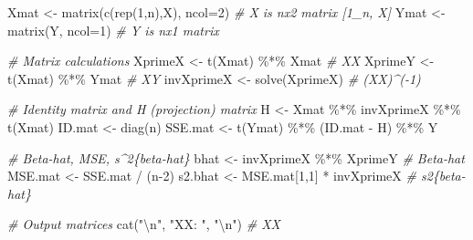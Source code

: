 \documentclass[
]{article}
\newenvironment{Shaded}{\begin{snugshade}}{\end{snugshade}}
\newcommand{\AttributeTok}[1]{\textcolor[rgb]{0.77,0.63,0.00}{#1}}
\newcommand{\CommentTok}[1]{\textcolor[rgb]{0.56,0.35,0.01}{\textit{#1}}}
\newcommand{\DecValTok}[1]{\textcolor[rgb]{0.00,0.00,0.81}{#1}}
\newcommand{\FunctionTok}[1]{\textcolor[rgb]{0.00,0.00,0.00}{#1}}
\newcommand{\NormalTok}[1]{#1}
\newcommand{\OtherTok}[1]{\textcolor[rgb]{0.56,0.35,0.01}{#1}}
\newcommand{\SpecialCharTok}[1]{\textcolor[rgb]{0.00,0.00,0.00}{#1}}
\newcommand{\StringTok}[1]{\textcolor[rgb]{0.31,0.60,0.02}{#1}}
\begin{document}
\begin{Shaded}
\begin{Highlighting}[]
\NormalTok{Xmat }\OtherTok{\textless{}{-}} \FunctionTok{matrix}\NormalTok{(}\FunctionTok{c}\NormalTok{(}\FunctionTok{rep}\NormalTok{(}\DecValTok{1}\NormalTok{,n),X), }\AttributeTok{ncol=}\DecValTok{2}\NormalTok{) }\CommentTok{\# X is nx2 matrix [1\_n, X]}
\NormalTok{Ymat }\OtherTok{\textless{}{-}} \FunctionTok{matrix}\NormalTok{(Y, }\AttributeTok{ncol=}\DecValTok{1}\NormalTok{) }\CommentTok{\# Y is nx1 matrix}

\CommentTok{\# Matrix calculations}
\NormalTok{XprimeX }\OtherTok{\textless{}{-}} \FunctionTok{t}\NormalTok{(Xmat) }\SpecialCharTok{\%*\%}\NormalTok{ Xmat }\CommentTok{\# X\textquotesingle{}X }
\NormalTok{XprimeY }\OtherTok{\textless{}{-}} \FunctionTok{t}\NormalTok{(Xmat) }\SpecialCharTok{\%*\%}\NormalTok{ Ymat }\CommentTok{\# X\textquotesingle{}Y}
\NormalTok{invXprimeX }\OtherTok{\textless{}{-}} \FunctionTok{solve}\NormalTok{(XprimeX) }\CommentTok{\# (X\textquotesingle{}X)\^{}({-}1)}

\CommentTok{\# Identity matrix and H (projection) matrix}
\NormalTok{H }\OtherTok{\textless{}{-}}\NormalTok{ Xmat }\SpecialCharTok{\%*\%}\NormalTok{ invXprimeX }\SpecialCharTok{\%*\%} \FunctionTok{t}\NormalTok{(Xmat)}
\NormalTok{ID.mat }\OtherTok{\textless{}{-}} \FunctionTok{diag}\NormalTok{(n)}
\NormalTok{SSE.mat }\OtherTok{\textless{}{-}} \FunctionTok{t}\NormalTok{(Ymat) }\SpecialCharTok{\%*\%}\NormalTok{ (ID.mat }\SpecialCharTok{{-}}\NormalTok{ H) }\SpecialCharTok{\%*\%}\NormalTok{ Y}

\CommentTok{\# Beta{-}hat, MSE, s\^{}2\{beta{-}hat\}}
\NormalTok{bhat }\OtherTok{\textless{}{-}}\NormalTok{ invXprimeX }\SpecialCharTok{\%*\%}\NormalTok{ XprimeY }\CommentTok{\# Beta{-}hat}
\NormalTok{MSE.mat }\OtherTok{\textless{}{-}}\NormalTok{ SSE.mat }\SpecialCharTok{/}\NormalTok{ (n}\DecValTok{{-}2}\NormalTok{)}
\NormalTok{s2.bhat }\OtherTok{\textless{}{-}}\NormalTok{ MSE.mat[}\DecValTok{1}\NormalTok{,}\DecValTok{1}\NormalTok{] }\SpecialCharTok{*}\NormalTok{ invXprimeX }\CommentTok{\# s2\{beta{-}hat\}}

\CommentTok{\# Output matrices}
\FunctionTok{cat}\NormalTok{(}\StringTok{"}\SpecialCharTok{\textbackslash{}n}\StringTok{"}\NormalTok{, }\StringTok{"X\textquotesingle{}X: "}\NormalTok{, }\StringTok{"}\SpecialCharTok{\textbackslash{}n}\StringTok{"}\NormalTok{) }\CommentTok{\# X\textquotesingle{}X}
\end{Highlighting}
\end{Shaded}
\end{document}
